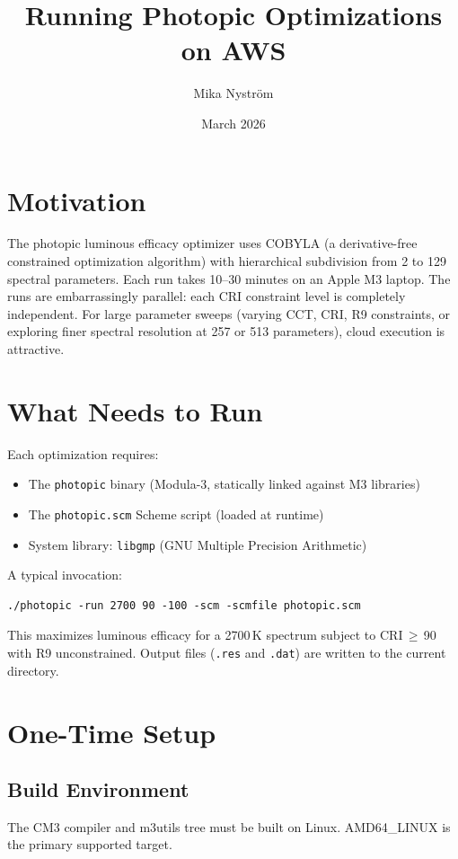\documentclass[11pt]{article}
\title{Running Photopic Optimizations on AWS}
\author{Mika Nystr\"om}
\date{March 2026}
\begin{document}
\maketitle

\section{Motivation}

The photopic luminous efficacy optimizer uses COBYLA (a derivative-free
constrained optimization algorithm) with hierarchical subdivision from
2 to 129 spectral parameters.  Each run takes 10--30 minutes on an
Apple M3 laptop.  The runs are embarrassingly parallel: each CRI
constraint level is completely independent.  For large parameter
sweeps (varying CCT, CRI, R9 constraints, or exploring finer spectral
resolution at 257 or 513 parameters), cloud execution is attractive.

\section{What Needs to Run}

Each optimization requires:
\begin{itemize}
\item The \texttt{photopic} binary (Modula-3, statically linked against M3 libraries)
\item The \texttt{photopic.scm} Scheme script (loaded at runtime)
\item System library: \texttt{libgmp} (GNU Multiple Precision Arithmetic)
\end{itemize}

A typical invocation:
\begin{lstlisting}
./photopic -run 2700 90 -100 -scm -scmfile photopic.scm
\end{lstlisting}
This maximizes luminous efficacy for a 2700\,K spectrum subject to
CRI\,$\geq$\,90 with R9 unconstrained.  Output files (\texttt{.res}
and \texttt{.dat}) are written to the current directory.

\section{One-Time Setup}

\subsection{Build Environment}

The CM3 compiler and m3utils tree must be built on Linux.  AMD64\_LINUX
is the primary supported target.
\end{document}
